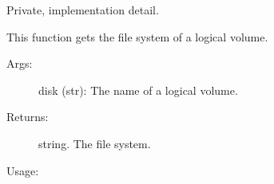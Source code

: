 \documentclass[letterpaper,10pt,english]{sphinxmanual}
\begin{document}
\begin{fulllineitems}
\label{\detokenize{linux:getdevinfo.linux.get_lv_file_system}}
Private, implementation detail.

This function gets the file system of a logical volume.
\begin{description}
\item[{Args:}] \leavevmode
disk (str):   The name of a logical volume.

\item[{Returns:}] \leavevmode
string. The file system.

\end{description}

Usage:

\begin{sphinxVerbatim}[commandchars=\\\{\}]
  
\end{sphinxVerbatim}

\end{fulllineitems}

\end{document}
